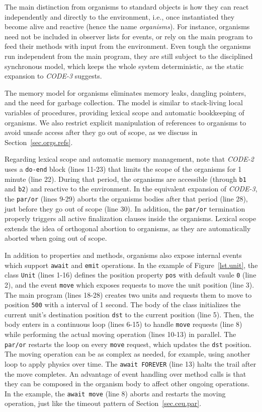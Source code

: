 \documentclass{acm_proc_article-sp}
\newcommand{\CEU}{\textsc{C\'{e}u}\xspace}
\newcommand{\code}[1] {{\small{\texttt{#1}}}}
\newcommand{\1}{\;}
\newcommand{\2}{\;\;}
\newcommand{\3}{\;\;\;}
\newcommand{\5}{\;\;\;\;\;}
\begin{document}
The main distinction from organisms to standard objects is how they can react 
independently and directly to the environment, i.e., once instantiated they 
become alive and reactive (hence the name \emph{organisms}).
%
For instance, organisms need not be included in observer lists for events, or 
rely on the main program to feed their methods with input from the environment.
%
Even tough the organisms run independent from the main program, they are still 
subject to the disciplined synchronous model, which keeps the whole system 
deterministic, as the static expansion to \emph{CODE-3} suggests.
%

The memory model for organisms eliminates memory leaks, dangling pointers, and 
the need for garbage collection.
%
The model is similar to stack-living local variables of procedures, providing 
lexical scope and automatic bookkeeping of organisms.
We also restrict explicit manipulation of references to organisms to avoid 
unsafe access after they go out of scope, as we discuss in 
Section~\ref{sec.orgs.refs}.

Regarding lexical scope and automatic memory management, note that 
\emph{CODE-2} uses a \code{do-end} block (lines 11-23) that limits the scope of 
the organisms for 1 minute (line 22).
%
During that period, the organisms are accessible (through \code{b1} and 
\code{b2}) and reactive to the environment.
%
In the equivalent expansion of \emph{CODE-3}, the \code{par/or} (lines 9-29) 
aborts the organisms bodies after that period (line 28), just before they go 
out of scope (line 30).
%
In addition, the \code{par/or} termination properly triggers all active 
finalization clauses inside the organisms.
%
Lexical scope extends the idea of orthogonal abortion to organisms, as they are 
automatically aborted when going out of scope.

In addition to properties and methods, organisms also expose internal events 
which support \code{await} and \code{emit} operations.
%
In the example of Figure~\ref{lst.unit}, the class \code{Unit} (lines 1-16) 
defines the position property \code{pos} with default vaule \code{0} (line 2), 
and the event \code{move} which exposes requests to move the unit position 
(line 3).
%
The main program (lines 18-28) creates two units and requests them to move to 
position \code{500} with a interval of 1 second.
%
The body of the class initializes the current unit's destination position 
\code{dst} to the current position (line 5).
Then, the body enters in a continuous loop (lines 6-15) to handle \code{move} 
requests (line 8) while performing the actual moving operation (lines 10-13) in 
parallel.
The \code{par/or} restarts the loop on every \code{move} request, which updates 
the \code{dst} position.
%
The moving operation can be as complex as needed, for example, using another 
loop to apply physics over time.
The \code{await FOREVER} (line 13) halts the trail after the move completes.
%
An advantage of event handling over method calls is that they can be composed 
in the organism body to affect other ongoing operations.
In the example, the \code{await move} (line 8) aborts and restarts the moving 
operation, just like the timeout pattern of Section~\ref{sec.ceu.par}.
\end{document}
